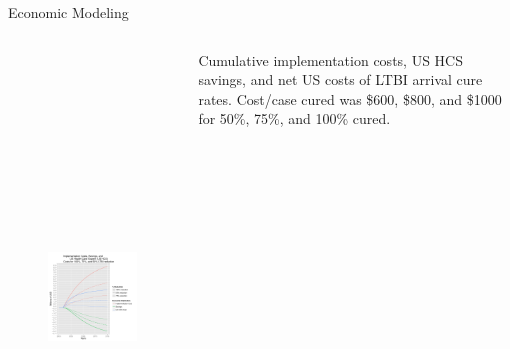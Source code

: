 \documentclass[final]{beamer}
\begin{document}
\begin{frame}
\begin{columns}[T]
\begin{column}{.3\textwidth}
\begin{block}{Economic Modeling}
\begin{columns}[T]
\begin{column}{.66\textwidth}
\begin{figure}[h]
\begin{center}
                \includegraphics[width=\textwidth,height=13cm]{EnLTBIRedGroupCost.pdf}
              \end{center}
              \caption{}
              \label{fig:redEnLTBI_costs}
            \end{figure}
          \end{column}
          \begin{column}{.26\textwidth}
          \begin{description}
            [Figure : ]Cumulative implementation costs, US HCS savings, and net
                       US costs of LTBI arrival cure rates. Cost/case cured was
                       \$600, \$800, and \$1000 for 50\%, 75\%, and 100\%
                       cured.
          \end{description}
          \end{column}
        \end{columns}
      \end{block}
    \end{column}


\end{columns}
\end{frame}
\end{document}
